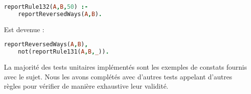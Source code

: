 \begin{lstlisting}[language=Prolog,frame=single]
reportRule132(A,B,50) :-
    reportReversedWays(A,B).
\end{lstlisting}

Est devenue :

\begin{lstlisting}[language=Prolog,frame=single]
reportReversedWays(A,B),
    not(reportRule131(A,B,_)).
\end{lstlisting}

La majorité des tests unitaires implémentés sont les exemples de constats fournis avec le sujet. Nous les avons complétés avec d'autres tests appelant d'autres règles pour vérifier de manière exhaustive leur validité.

